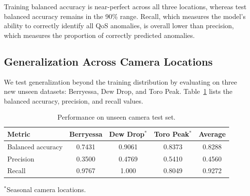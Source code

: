 \documentclass{article}
\begin{document}
Training balanced accuracy is near-perfect across all three locations, whereas test balanced accuracy remains in the 90\% range. Recall, which measures the model's ability to correctly identify all \ac{QoS} anomalies, is overall lower than precision, which measures the proportion of correctly predicted anomalies. 

\subsection{Generalization Across Camera Locations}


We test generalization beyond the training distribution by evaluating on three new unseen datasets: Berryessa, Dew Drop, and Toro Peak. Table~\ref{tab:camera_accuracies} lists the balanced accuracy, precision, and recall values. 

\begin{table}[H]
\centering

\caption{Performance on unseen camera test set.}
\label{tab:camera_accuracies}

\begin{tabular}{lcccc}
\toprule
\textbf{Metric} & Berryessa & Dew Drop$^{*}$ & Toro Peak$^{*}$ & Average \\
\midrule

Balanced accuracy & 0.7431 & 0.9061 & 0.8373 & 0.8288 \\
Precision & 0.3500 & 0.4769 & 0.5410 & 0.4560 \\
Recall & 0.9767 & 1.000 & 0.8049 & 0.9272 \\

\bottomrule
\end{tabular}

\vspace{4pt}
\footnotesize
$^{*}$Seasonal camera locations.

\end{table}
\end{document}
